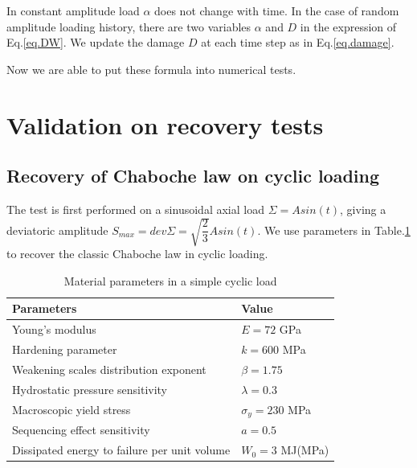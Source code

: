 \documentclass[3p,times,number,review]{elsarticle}
\begin{document}
In constant amplitude load $\alpha$ does not change with time. In the case of random amplitude loading history, there are two variables $\alpha$ and $D$ in the expression of Eq.\eqref{eq.DW}.  We update the damage $D$ at each time step as in Eq.\eqref{eq.damage}.

Now we are able to put these formula into numerical tests.


\newpage
\section{Validation on recovery tests}
\subsection{Recovery of Chaboche law on cyclic loading}
The test is first performed on a sinusoidal axial load $\Sigma=Asin(t)$, giving a deviatoric amplitude $S_{max}=dev\Sigma=\sqrt{\dfrac{2}{3}}Asin(t)$. We use parameters in Table.\ref{tab:Sin} to recover the classic Chaboche law in cyclic loading.
\begin{table}[!h]
	\centering
	\begin{tabular}{ll}
		\hline
		\textbf{Parameters}                                         & \textbf{Value}                    \\ \hline
Young's modulus                                             & $E=72$ GPa                       \\
Hardening parameter                                         &  $k=600$ MPa \\
Weakening scales distribution exponent                      & $\beta=1.75$                             \\
Hydrostatic pressure sensitivity                            & $\lambda=0.3$                     \\
Macroscopic yield stress                                    & $\sigma_y=230$ MPa              \\
Sequencing effect sensitivity                               & $a=0.5$                        \\
Dissipated energy to failure per unit volume                & $W_0=3$ MJ(MPa)                       \\ \hline
	\end{tabular}
		\caption{Material parameters in a simple cyclic load }
		\label{tab:Sin}
\end{table}
\end{document}
